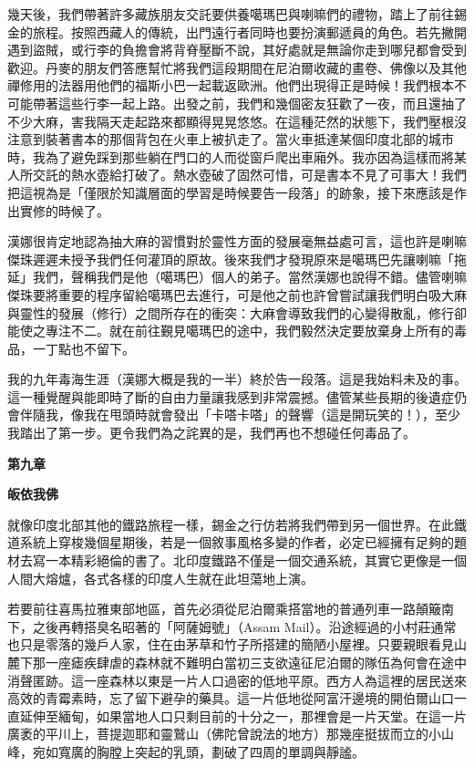幾天後，我們帶著許多藏族朋友交託要供養噶瑪巴與喇嘛們的禮物，踏上了前往錫金的旅程。按照西藏人的傳統，出門遠行者同時也要扮演郵遞員的角色。若先撇開遇到盜賊，或行李的負擔會將背脊壓斷不說，其好處就是無論你走到哪兒都會受到歡迎。丹麥的朋友們答應幫忙將我們這段期間在尼泊爾收藏的畫卷、佛像以及其他禪修用的法器用他們的福斯小巴一起載返歐洲。他們出現得正是時候！我們根本不可能帶著這些行李一起上路。出發之前，我們和幾個密友狂歡了一夜，而且還抽了不少大麻，害我隔天走起路來都顯得晃晃悠悠。在這種茫然的狀態下，我們壓根沒注意到裝著書本的那個背包在火車上被扒走了。當火車抵達某個印度北部的城市時，我為了避免踩到那些躺在門口的人而從窗戶爬出車廂外。我亦因為這樣而將某人所交託的熱水壺給打破了。熱水壺破了固然可惜，可是書本不見了可事大！我們把這視為是「僅限於知識層面的學習是時候要告一段落」的跡象，接下來應該是作出實修的時候了。

漢娜很肯定地認為抽大麻的習慣對於靈性方面的發展毫無益處可言，這也許是喇嘛傑珠遲遲未授予我們任何灌頂的原故。後來我們才發現原來是噶瑪巴先讓喇嘛「拖延」我們，聲稱我們是他（噶瑪巴）個人的弟子。當然漢娜也說得不錯。儘管喇嘛傑珠要將重要的程序留給噶瑪巴去進行，可是他之前也許曾嘗試讓我們明白吸大麻與靈性的發展（修行）之間所存在的衝突：大麻會導致我們的心變得散亂，修行卻能使之專注不二。就在前往覲見噶瑪巴的途中，我們毅然決定要放棄身上所有的毒品，一丁點也不留下。

我的九年毒海生涯（漢娜大概是我的一半）終於告一段落。這是我始料未及的事。這一種覺醒與能即時了斷的自由力量讓我感到非常震撼。儘管某些長期的後遺症仍會伴隨我，像我在甩頭時就會發出「卡嗒卡嗒」的聲響（這是開玩笑的！），至少我踏出了第一步。更令我們為之詫異的是，我們再也不想碰任何毒品了。

\textbf{第九章}

\textbf{皈依我佛}

就像印度北部其他的鐵路旅程一樣，錫金之行仿若將我們帶到另一個世界。在此鐵道系統上穿梭幾個星期後，若是一個敘事風格多變的作者，必定已經擁有足夠的題材去寫一本精彩絕倫的書了。北印度鐵路不僅是一個交通系統，其實它更像是一個人間大熔爐，各式各樣的印度人生就在此坦蕩地上演。

若要前往喜馬拉雅東部地區，首先必須從尼泊爾乘搭當地的普通列車一路顛簸南下，之後再轉搭臭名昭著的「阿薩姆號」（Assam
Mail）。沿途經過的小村莊通常也只是零落的幾戶人家，住在由茅草和竹子所搭建的簡陋小屋裡。只要親眼看見山麓下那一座瘧疾肆虐的森林就不難明白當初三支欲遠征尼泊爾的隊伍為何會在途中消聲匿跡。這一座森林以東是一片人口過密的低地平原。西方人為這裡的居民送來高效的青霉素時，忘了留下避孕的藥具。這一片低地從阿富汗邊境的開伯爾山口一直延伸至緬甸，如果當地人口只剩目前的十分之一，那裡會是一片天堂。在這一片廣袤的平川上，菩提迦耶和靈鷲山（佛陀曾說法的地方）那幾座挺拔而立的小山峰，宛如寬廣的胸膛上突起的乳頭，劃破了四周的單調與靜謐。

